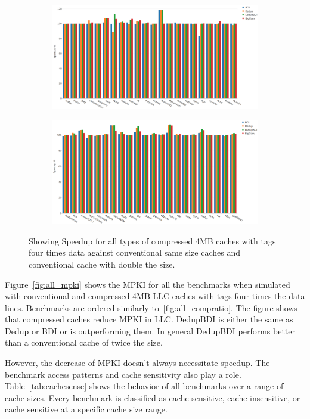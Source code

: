 \begin{figure}
    \begin{subfigure}{\textwidth}
        \includegraphics[width=\textwidth]{all4-speedup1.png}
    \end{subfigure}
    \begin{subfigure}{\textwidth}
        \includegraphics[width=\textwidth]{all4-speedup2.png}
    \end{subfigure}
    \caption[All benchmarks: 0.5MB Speedup]{Showing Speedup for all types of compressed 4MB caches with tags four times data against conventional same size caches and conventional cache with double the size.}
    \label{fig:all_speedup2}
\end{figure}
Figure~\ref{fig:all_mpki} shows the MPKI for all the benchmarks when simulated with conventional and compressed 4MB LLC caches with tags four times the data lines. Benchmarks are ordered similarly to~\ref{fig:all_compratio}. The figure shows that compressed caches reduce MPKI in LLC. DedupBDI is either the same as Dedup or BDI or is outperforming them. In general DedupBDI performs better than a conventional cache of twice the size.\par
However, the decrease of MPKI doesn't always necessitate speedup. The benchmark access patterns and cache sensitivity also play a role. Table~\ref{tab:cachesense} shows the behavior of all benchmarks over a range of cache sizes. Every benchmark is classified as cache sensitive, cache insensitive, or cache sensitive at a specific cache size range.

